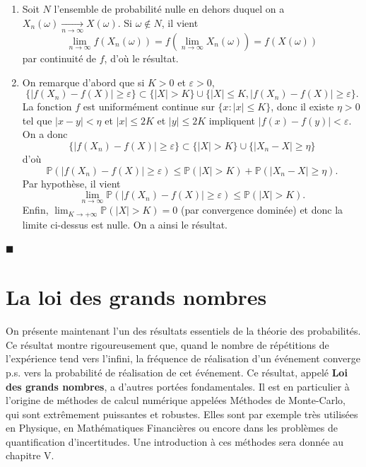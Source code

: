 \begin{preuve}
\begin{enumerate}
\def\labelenumi{\arabic{enumi}.}
\item
  Soit \(N\) l'ensemble de probabilité nulle en dehors duquel on a
  \(X_n(\omega) \xrightarrow[n \to \infty]{} X(\omega)\). Si
  \(\omega \notin N\), il vient
  \[ \lim_{n \to \infty}f(X_n(\omega)) = f(\lim_{n \to \infty}X_n(\omega)) = f(X(\omega))\]
  par continuité de \(f\), d'où le résultat.
\item
  On remarque d'abord que si \(K >0\) et \(\varepsilon >0\),
  \[\{|f(X_n)-f(X)| \geq \varepsilon\} \subset \{|X| > K\}\cup\{|X| \leq K, |f(X_n)-f(X)| \geq \varepsilon\}.\]
  La fonction \(f\) est uniformément continue sur
  \(\{x : |x| \leq K\}\), donc il existe \(\eta > 0\) tel que
  \(|x-y| <\eta\) et \(|x| \leq 2K\) et \(|y|\leq 2K\) impliquent
  \(|f(x) - f(y)| <\varepsilon\). On a donc
  \[\{|f(X_n)-f(X)| \geq \varepsilon\} \subset \{|X| > K\}\cup\{|X_n-X| \geq \eta\}\]
  d'où
  \[\mathbb{P}(|f(X_n)-f(X)| \geq \varepsilon) \leq \mathbb{P}(|X| > K) + \mathbb{P}(|X_n-X| \geq \eta).\]
  Par hypothèse, il vient
  \[ \lim_{n \to \infty} \mathbb{P}(|f(X_n)-f(X)| \geq \varepsilon) \leq \mathbb{P}(|X| > K) .\]
  Enfin, \(\lim_{K\to +\infty} \mathbb{P}(|X| > K) = 0\) (par
  convergence dominée) et donc la limite ci-dessus est nulle. On a ainsi
  le résultat.
\end{enumerate}

\hfill$\blacksquare$
\end{preuve}

\section{La loi des grands nombres}\label{IV-la-loi-des-grands-nombres}

On présente maintenant l'un des résultats essentiels de la théorie des
probabilités. Ce résultat montre rigoureusement que, quand le nombre de
répétitions de l'expérience tend vers l'infini, la fréquence de
réalisation d'un événement converge p.s. vers la probabilité de
réalisation de cet événement. Ce résultat, appelé \textbf{Loi des grands
nombres}, a d'autres portées fondamentales. Il est en particulier à
l'origine de méthodes de calcul numérique appelées Méthodes de
Monte-Carlo, qui sont extrêmement puissantes et robustes. Elles sont par
exemple très utilisées en Physique, en Mathématiques Financières ou
encore dans les problèmes de quantification d'incertitudes. Une
introduction à ces méthodes sera donnée au chapitre V.


